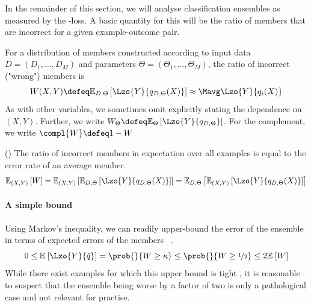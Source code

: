 \documentclass[../main.tex]{subfiles}
\begin{document}
In the remainder of this section, we will analyse classification ensembles as measured by the \zeroone-loss. 
A basic quantity for this will be the ratio of members that are incorrect for a given example-outcome pair.

\begin{definition}
For a distribution of members constructed according to input data $D = (D_{1}, \dots, D_{M})$ and parameters $\Theta = (\Theta_{1}, \dots, \Theta_{M})$, the ratio of incorrect ("wrong") members is
$$
W(X,Y) \defeq \mathbb{E}_{D, \Theta}\left[ \Lzo{Y}{q_{D, \Theta}(X)} \right] \approx \Mavg \Lzo{Y}{q_{i}(X)}
$$
As with other variables, we sometimes omit explicitly stating the dependence on $(X,Y)$. Further, we write $W_{\Theta} \defeq \mathbb{E}_{\Theta}\left[ \Lzo{Y}{q_{D, \Theta}} \right]$. For the complement, we write $\compl{W} \defeq 1 - W$
\end{definition}

\begin{lemma} (\cite{theisen_WhenAreEnsembles_2023}) The ratio of incorrect members in expectation over all examples is equal to the error rate of an average member.
    \begin{align*} 
    \mathbb{E}_{(X,Y) }\left[ W  \right]  = \mathbb{E}_{(X,Y) }\left[ \mathbb{E}_{D,\Theta}\left[ \Lzo{Y}{q_{D,\Theta}(X)} \right]  \right]  = \mathbb{E}_{D,\Theta}\left[ \mathbb{E}_{(X,Y) }\left[ \Lzo{Y}{q_{D,\Theta}(X)} \right]  \right] 
    \end{align*}
    \label{thm:W-lzo}
\end{lemma}


\paragraph{A simple bound} Using Markov's inequality, we can readily upper-bound the error of the ensemble in terms of expected errors of the members~\cite{theisen_WhenAreEnsembles_2023}
.
$$
0 \leq \mathbb{E}_{}\left[ \Lzo{Y}{\bar{q}} \right] = \prob{}{W \geq \kappa} \leq \prob{}{W \geq \nicefrac{1}{2}} \leq 2 \mathbb{E}_{}\left[ W \right] 
$$
While there exist examples for which this upper bound is tight \cite{theisen_WhenAreEnsembles_2023}, it is reasonable to suspect that the ensemble being worse by a factor of two is only a pathological case and not relevant for practise.
\end{document}
